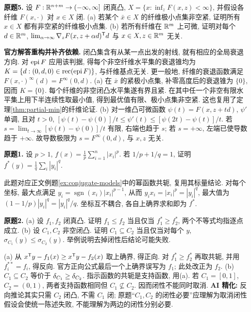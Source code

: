 \begin{exercise}\label{ass:6253-hw3-q5}
\textbf{原题5.} 设 $F:\mathbb R^{n+m}\to(-\infty,\infty]$ 闭真凸, $X=\{x:\inf_zF(x,z)<\infty\}$, 并假设各纤维 $F(x,\cdot)$ 对 $x\in X$ 闭.
(a) 若某个 $\bar x\in X$ 的纤维极小点集非空紧, 证明所有 $x\in X$ 都有非空紧的纤维极小点集.
(b) 若所有纤维在 $\mathbb R^m$ 上可微, 证明对每个 $d\in\mathbb R^m$, $\lim_{\alpha\to\infty}\nabla_zF(x,z+\alpha d)^{\mathsf T} d$ 与 $x\in X,z\in\mathbb R^m$ 无关.
\end{exercise}
\begin{solution}
\textbf{官方解答重构并补齐依赖.} 闭凸集含有从某一点出发的射线, 就有相应的全局衰退方向. 对 $\operatorname{epi} F$ 应用该判据, 得每个非空纤维水平集的衰退锥均为
$K=\{d:(0,d,0)\in\operatorname{rec}(\operatorname{epi} F)\}$, 与纤维基点无关. 更一般地, 纤维的衰退函数满足
$F(x,\cdot)^\infty(d)=F^\infty(0,d)$.
(a) 在 $\bar x$ 的紧极小点集, 补零高度后的衰退锥为 $\{0\}$, 因而 $K=\{0\}$. 每个纤维的非空闭凸水平集遂有界且紧. 在其中任一个非空有限水平集上用下半连续性取最小值, 得到最优值有限、极小点集非空紧. 这也复用了定理\ref{thm:partial-min}的纤维论证.
(b) 对一维凸可微函数 $\psi(t)=F(x,z+td)$, $\psi'$ 单调, 且对 $t>0$,
$[\psi(t)-\psi(0)]/t\le\psi'(t)\le[\psi(2t)-\psi(t)]/t$.
若 $s=\lim_{t\to\infty}[\psi(t)-\psi(0)]/t$ 有限, 右端也趋于 $s$; 若 $s=+\infty$, 左端已使导数趋于 $+\infty$. 故导数极限为 $s=F^\infty(0,d)$, 与 $x,z$ 无关.
\end{solution}

\begin{exercise}\label{ass:6253-hw4-q1}
\textbf{原题1.} 设 $p>1$, $f(x)=\frac1p\sum_{i=1}^n|x_i|^p$. 若 $1/p+1/q=1$, 证明 $f^*(y)=\frac1q\sum_i|y_i|^q$.
\end{exercise}
\begin{solution}
此题对应正文例题\ref{ex:conjugate-models}中的幂函数共轭, 复用其标量结论. 对每个坐标, 最大点满足 $y_i=\operatorname{sgn}(x_i)|x_i|^{p-1}$, 从而 $y_ix_i=|x_i|^p=|y_i|^q$, 最大值为 $(1-1/p)|y_i|^q=|y_i|^q/q$. 坐标互不耦合, 各自上确界求和即为 $f^*$.
\end{solution}

\begin{exercise}\label{ass:6253-hw4-q2}
\textbf{原题2.} (a) 设 $f_1,f_2$ 闭真凸. 证明 $f_1\le f_2$ 当且仅当 $f_1^*\ge f_2^*$, 两个不等式均指逐点成立.
(b) 设 $C_1,C_2$ 非空闭凸. 证明 $C_1\subseteq C_2$ 当且仅当对每个 $y$, $\sigma_{C_1}(y)\le\sigma_{C_2}(y)$. 举例说明去掉闭性后结论可能失败.
\end{exercise}
\begin{solution}
(a) 从 $x^{\mathsf T} y-f_1(x)\ge x^{\mathsf T} y-f_2(x)$ 取上确界, 得正向. 对 $f_1^*\ge f_2^*$ 再取共轭, 并用 $f_i^{**}=f_i$, 得反向. 官方正向公式最后一个上确界误写为 $f_1$; 此处改正为 $f_2$.
(b) $C_1\subseteq C_2$ 等价于 $\delta_{C_1}\ge\delta_{C_2}$. 指示函数的共轭是支持函数, 用(a). 若 $C_1=[0,1]$, $C_2=(0,1)$, 两者支持函数相同但 $C_1\not\subseteq C_2$. 因而闭性不能同时取消. \textbf{AI 精化:} 反向推论其实只需 $C_2$ 闭凸, 不需 $C_1$ 闭; 原题“$C_1,C_2$ 的闭性必要”应理解为取消闭性假设会使统一陈述失败, 不能理解为两边的闭性分别必要.
\end{solution}

